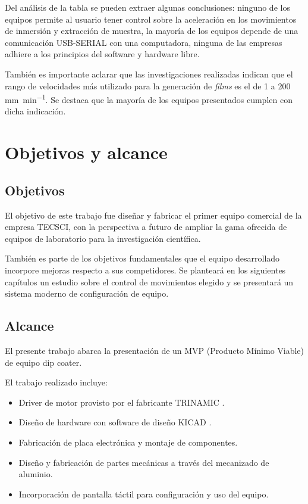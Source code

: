 Del análisis de la tabla se pueden extraer algunas conclusiones: ninguno de los equipos permite al usuario tener control sobre la aceleración en los movimientos de inmersión y extracción de muestra, la mayoría  de los equipos depende de una comunicación USB-SERIAL con una computadora, ninguna de las empresas adhiere a los principios del software y hardware libre.  

También es importante aclarar que las investigaciones realizadas indican que el rango de velocidades más utilizado para la generación de \textit{films} es el de 1 a 200 \si{\milli\meter\per\minute}. Se destaca que la mayoría de los equipos presentados cumplen con dicha indicación.


\section{Objetivos y alcance}

\subsection{Objetivos}

El objetivo de este trabajo fue diseñar y fabricar el primer equipo comercial de la empresa TECSCI, con la perspectiva a futuro de ampliar la gama ofrecida de equipos de laboratorio para la investigación científica.

También es parte de los objetivos fundamentales que el equipo desarrollado incorpore mejoras respecto a sus competidores. Se planteará en los siguientes capítulos un estudio sobre el control de movimientos elegido y se presentará un sistema moderno de configuración de equipo. 

\subsection{Alcance}

El presente trabajo abarca la presentación de un MVP (Producto Mínimo Viable) de equipo dip coater. 


El trabajo realizado incluye:

\begin{itemize}
\item Driver de motor provisto por el fabricante TRINAMIC \citep{3_web_trinamic}.
\item Diseño de hardware con software de diseño KICAD \citep{web_kicad}.
\item Fabricación de placa electrónica y montaje de componentes.
\item Diseño y fabricación de partes mecánicas a través del mecanizado de aluminio.
\item Incorporación de pantalla táctil para configuración y uso del equipo.
\end{itemize}



